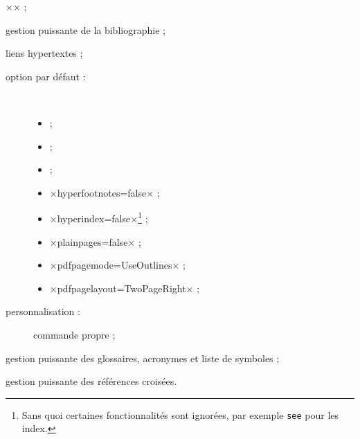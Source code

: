 \begin{description}
\begin{description}
      ×\SetCiteCommand{\autocite}× ;
  \end{description}
\item[\package*{biblatex} :] gestion puissante de la bibliographie ;
\item[\package*{hyperref} :] %
  liens hypertextes ;
  \begin{description}
  \item[option par défaut :]\
    \begin{itemize}
    \item {} ;
    \item {} ;
    \item {} ;
    \item ×hyperfootnotes=false× ;
    \item ×hyperindex=false×\footnote{Sans quoi certaines fonctionnalités sont
        ignorées, par exemple \protect\lstinline|see| pour les index.} ;
    \item ×plainpages=false× ;
    \item ×pdfpagemode=UseOutlines× ;
    \item ×pdfpagelayout=TwoPageRight× ;
    \end{itemize}
  \item[personnalisation :] commande propre  ;
  \end{description}
\item[\package*{glossaries} :] gestion puissante des glossaires,
  acronymes et liste de symboles ;
\item[\package*{cleveref} :] gestion puissante des références croisées.
\end{description}

%
\iffalse
\fi
